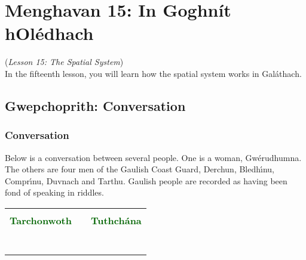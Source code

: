\section{Menghavan 15: In Goghn\'{i}t hOl\'{e}dhach}
(\textit{Lesson 15: The Spatial System})\\

In the fifteenth lesson, you will learn how the spatial system works in Gal\'{a}thach.

\subsection{Gwepchoprith: Conversation}

\subsubsection{Conversation}

Below is a conversation between several people. One is a woman, Gw\'{e}rudhumna. The others are four men of the Gaulish Coast Guard, Derchun, Bledh\'{\i}nu, Compr\'{\i}nu, Duvnach and Tarthu. Gaulish people are recorded as having been fond of speaking in riddles.

\begin{table}[H]
\centering
    \begin{tabular}{cM{10.0cm}c}
     &  & \\
    \textcolor{darkgreen}{\textbf{Tarchonwoth}} &  & \textcolor{darkgreen}{\textbf{Tuthch\'{a}na}}\\
     &  & \\
     &  & \\
     &  & \\
     &  & \\
     &  & \\
     &  & \\
     &  & 
    \end{tabular}
\end{table}

